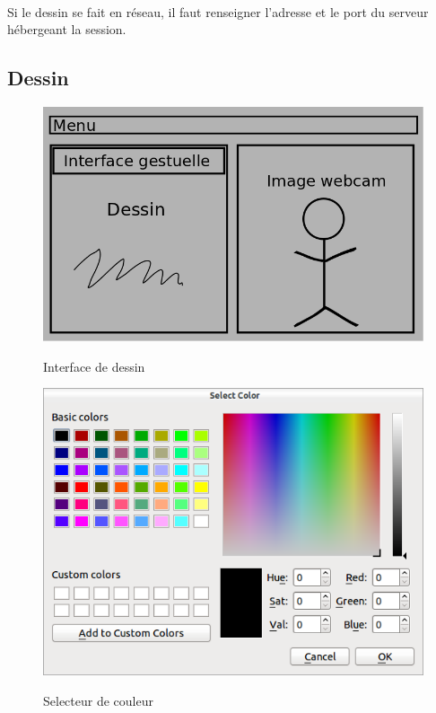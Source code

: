 \documentclass{report}
\begin{document}
				\paragraph{}
				Si le dessin se fait en réseau, il faut renseigner l'adresse et le port du serveur hébergeant la session.
				\newpage
			\subsection{Dessin}
				\begin{figure}[!h]
						\centering
						\includegraphics[scale=0.4]{../images/interface.png}\\
						\caption{Interface de dessin}
						\label{Interface de dessin}
				\end{figure}
				\newpage
				\begin{figure}[!h]
						\centering
						\includegraphics[scale=0.4]{../images/colorpicker.png}\\
						\caption{Selecteur de couleur}
						\label{Selecteur de couleur}
				\end{figure}
\end{document}
